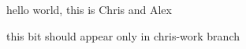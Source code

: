 \documentclass{report}
\begin{document}
hello world, this is Chris and Alex

this bit should appear only in chris-work branch
\end{document}
